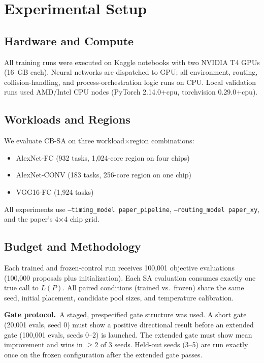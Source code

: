 \documentclass[10pt,conference]{IEEEtran}
\begin{document}
\section{Experimental Setup}
\label{sec:setup}

\subsection{Hardware and Compute}

All training runs were executed on Kaggle notebooks with two NVIDIA T4 GPUs
(16~GB each).  Neural networks are dispatched to GPU; all environment, routing,
collision-handling, and process-orchestration logic runs on CPU.  Local
validation runs used AMD/Intel CPU nodes (PyTorch 2.14.0+cpu,
torchvision 0.29.0+cpu).

\subsection{Workloads and Regions}

We evaluate CB-SA on three workload$\times$region combinations:
\begin{itemize}
  \item AlexNet-FC (932 tasks, 1,024-core region on four chips)
  \item AlexNet-CONV (183 tasks, 256-core region on one chip)
  \item VGG16-FC (1,924 tasks)
\end{itemize}
All experiments use \texttt{--timing\_model paper\_pipeline},
\texttt{--routing\_model paper\_xy}, and the paper's 4$\times$4 chip grid.

\subsection{Budget and Methodology}

Each trained and frozen-control run receives 100,001 objective evaluations
(100,000 proposals plus initialization).  Each SA evaluation consumes exactly
one true call to $L(P)$.  All paired conditions (trained vs.\ frozen) share the
same seed, initial placement, candidate pool sizes, and temperature calibration.

\textbf{Gate protocol.}\
A staged, prespecified gate structure was used.  A short gate (20,001 evals,
seed 0) must show a positive directional result before an extended gate
(100,001 evals, seeds 0--2) is launched.  The extended gate must show mean
improvement and wins in $\geq 2$ of 3 seeds.  Held-out seeds (3--5) are run
exactly once on the frozen configuration after the extended gate passes.
\end{document}

